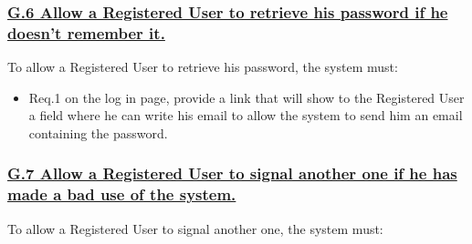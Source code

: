 			\subsubsection{\lbrack \hyperref[sec:g6]{G.6 Allow a Registered User to retrieve his password if he doesn't remember it.}\rbrack}\label{sec:frs6}
			To allow a Registered User to retrieve his password, the system must:

				\begin{itemize}
					\item \lbrack Req.1\rbrack \label{sec:fr1_g6} on the log in page, provide a link that will show to the Registered User a field where he can write his email to allow the system to send him an email containing the password.
				\end{itemize}

			\subsubsection{\lbrack \hyperref[sec:g7]{G.7 Allow a Registered User to signal another one if he has made a bad use of the system.}\rbrack}\label{sec:frs7}
			To allow a Registered User to signal another one, the system must:


